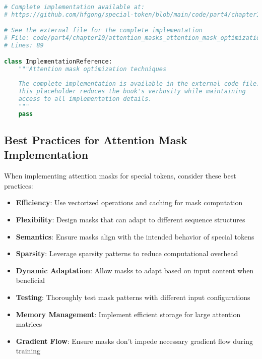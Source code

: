 \begin{lstlisting}[language=Python, caption={Attention mask optimization techniques}]
# Complete implementation available at:
# https://github.com/hfgong/special-token/blob/main/code/part4/chapter10/attention_masks_attention_mask_optimization_te.py

# See the external file for the complete implementation
# File: code/part4/chapter10/attention_masks_attention_mask_optimization_te.py
# Lines: 89

class ImplementationReference:
    """Attention mask optimization techniques
    
    The complete implementation is available in the external code file.
    This placeholder reduces the book's verbosity while maintaining
    access to all implementation details.
    """
    pass
\end{lstlisting}

\subsection{Best Practices for Attention Mask Implementation}

When implementing attention masks for special tokens, consider these best practices:

\begin{itemize}
\item \textbf{Efficiency}: Use vectorized operations and caching for mask computation
\item \textbf{Flexibility}: Design masks that can adapt to different sequence structures
\item \textbf{Semantics}: Ensure masks align with the intended behavior of special tokens
\item \textbf{Sparsity}: Leverage sparsity patterns to reduce computational overhead
\item \textbf{Dynamic Adaptation}: Allow masks to adapt based on input content when beneficial
\item \textbf{Testing}: Thoroughly test mask patterns with different input configurations
\item \textbf{Memory Management}: Implement efficient storage for large attention matrices
\item \textbf{Gradient Flow}: Ensure masks don't impede necessary gradient flow during training
\end{itemize}